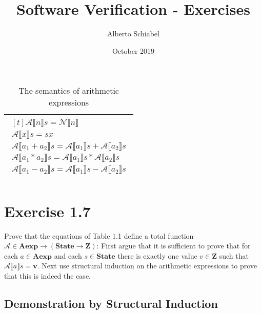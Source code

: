 \documentclass{article}
\title{Software Verification - Exercises}
\author{Alberto Schiabel}
\date{October 2019}
\begin{document}
\maketitle

\begin{table}[ht!]
 \centering
     \setlength{\tabcolsep}{1em} %
    \begin{tabular}{|p{\textwidth}|}
    \hline
    $\begin{aligned}[t] %
    \mathcal{A}\llbracket n \rrbracket s = \mathcal{N} \llbracket n \rrbracket \\
    \mathcal{A}\llbracket x \rrbracket s = s x \\
    \mathcal{A}\llbracket a_1 + a_2 \rrbracket s = \mathcal{A} \llbracket a_1 \rrbracket s + \mathcal{A} \llbracket a_2 \rrbracket s \\
    \mathcal{A}\llbracket a_1 * a_2 \rrbracket s = \mathcal{A} \llbracket a_1 \rrbracket s * \mathcal{A} \llbracket a_2 \rrbracket s \\
    \mathcal{A}\llbracket a_1 - a_2 \rrbracket s = \mathcal{A} \llbracket a_1 \rrbracket s - \mathcal{A} \llbracket a_2 \rrbracket s \\
    \end{aligned}$ \\
    \hline
    \end{tabular}
    \caption{The semantics of arithmetic expressions}
\end{table}


\section{Exercise 1.7}

Prove that the equations of Table 1.1 define a total function $\mathcal{A} \in \textbf{Aexp} \rightarrow
(\textbf{State} \rightarrow \textbf{Z})$: First argue that it is sufficient to prove that for each $a \in \textbf{Aexp}$
and each $s \in \textbf{State}$ there is exactly one value $v \in \textbf{Z}$ such that $\mathcal{A}\llbracket a \rrbracket s = \textbf{v}$.
Next use structural induction on the arithmetic expressions to prove that this is indeed the case.

\subsection{Demonstration by Structural Induction}
\end{document}
